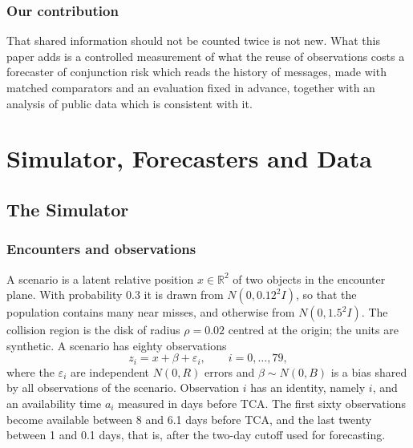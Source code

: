 \documentclass[conference]{IEEEtran}
\begin{document}
\subsubsection*{Our contribution}
That shared information should not be counted twice is not new. What this paper adds is a controlled measurement of what the reuse of observations costs a forecaster of conjunction risk which reads the history of messages, made with matched comparators and an evaluation fixed in advance, together with an analysis of public data which is consistent with it.

\section{Simulator, Forecasters and Data}\label{sec:model}

\subsection{The Simulator}

\subsubsection*{Encounters and observations}
A scenario is a latent relative position $x\in\mathbb{R}^2$ of two objects in the encounter plane. With probability $0.3$ it is drawn from $N(0,0.12^2 I)$, so that the population contains many near misses, and otherwise from $N(0,1.5^2 I)$. The collision region is the disk of radius $\rho=0.02$ centred at the origin; the units are synthetic. A scenario has eighty observations
\[
  z_i = x+\beta+\varepsilon_i, \qquad i=0,\dots,79,
\]
where the $\varepsilon_i$ are independent $N(0,R)$ errors and $\beta\sim N(0,B)$ is a bias shared by all observations of the scenario. Observation $i$ has an identity, namely $i$, and an availability time $a_i$ measured in days before TCA. The first sixty observations become available between 8 and 6.1 days before TCA, and the last twenty between 1 and 0.1 days, that is, after the two-day cutoff used for forecasting.
\end{document}

